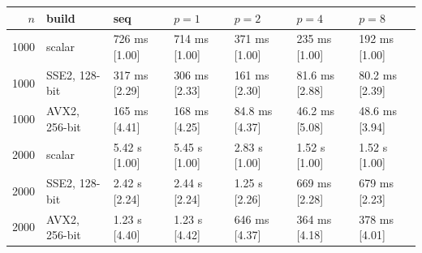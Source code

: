 \begin{tabular}{rllllll}
\toprule
$n$ & build & seq & $p{=}1$ & $p{=}2$ & $p{=}4$ & $p{=}8$ \\
\midrule
1000 & scalar & 726 ms [1.00] & 714 ms [1.00] & 371 ms [1.00] & 235 ms [1.00] & 192 ms [1.00] \\
1000 & SSE2, 128-bit & 317 ms [2.29] & 306 ms [2.33] & 161 ms [2.30] & 81.6 ms [2.88] & 80.2 ms [2.39] \\
1000 & AVX2, 256-bit & 165 ms [4.41] & 168 ms [4.25] & 84.8 ms [4.37] & 46.2 ms [5.08] & 48.6 ms [3.94] \\
\midrule
2000 & scalar & 5.42 s [1.00] & 5.45 s [1.00] & 2.83 s [1.00] & 1.52 s [1.00] & 1.52 s [1.00] \\
2000 & SSE2, 128-bit & 2.42 s [2.24] & 2.44 s [2.24] & 1.25 s [2.26] & 669 ms [2.28] & 679 ms [2.23] \\
2000 & AVX2, 256-bit & 1.23 s [4.40] & 1.23 s [4.42] & 646 ms [4.37] & 364 ms [4.18] & 378 ms [4.01] \\
\bottomrule
\end{tabular}

